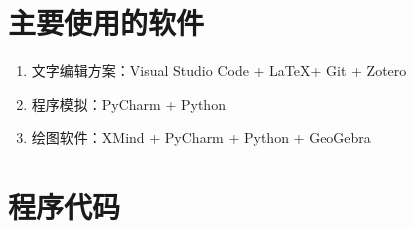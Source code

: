 %
%



\nocite{*}      %


%
%

\appendix

\section{主要使用的软件}

\begin{enumerate}
    \item 文字编辑方案：Visual Studio Code + \LaTeX + Git + Zotero
    \item 程序模拟：PyCharm + Python
    \item 绘图软件：XMind + PyCharm + Python + GeoGebra
\end{enumerate}

\section{程序代码}

\begin{mgCodeBlock}[文本预处理]
\end{mgCodeBlock}